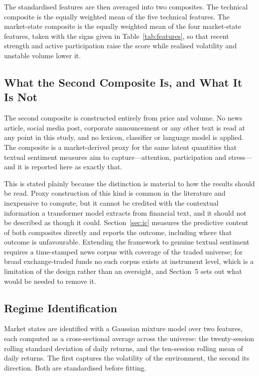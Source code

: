 \documentclass{singlecol-new}
\theoremstyle{TH}{
\newtheorem{lemma}{Lemma}
\newtheorem{theorem}[lemma]{Theorem}
\newtheorem{corrolary}[lemma]{Corrolary}
\newtheorem{conjecture}[lemma]{Conjecture}
\newtheorem{proposition}[lemma]{Proposition}
\newtheorem{claim}[lemma]{Claim}
\newtheorem{stheorem}[lemma]{Wrong Theorem}
\newtheorem{algorithm}{Algorithm}
}
\theoremstyle{THrm}{
\newtheorem{definition}{Definition}[section]
\newtheorem{question}{Question}[section]
\newtheorem{remark}{Remark}
\newtheorem{scheme}{Scheme}
}
\theoremstyle{THhit}{
\newtheorem{case}{Case}[section]
}
\begin{document}
The standardised features are then averaged into two composites. The technical
composite is the equally weighted mean of the five technical features. The market-state
composite is the equally weighted mean of the four market-state features, taken with
the signs given in Table~\ref{tab:features}, so that recent strength and active participation raise the
score while realised volatility and unstable volume lower it.

\subsection{What the Second Composite Is, and What It Is Not}
\label{sec:notsentiment}

The second composite is constructed entirely from price and volume. No news article,
social media post, corporate announcement or any other text is read at any point in
this study, and no lexicon, classifier or language model is applied. The composite is a
market-derived proxy for the same latent quantities that textual sentiment measures aim
to capture---attention, participation and stress---and it is reported here as exactly
that.

This is stated plainly because the distinction is material to how the results should be
read. Proxy construction of this kind is common in the literature and inexpensive to
compute, but it cannot be credited with the contextual information a transformer model
extracts from financial text, and it should not be described as though it could.
Section~\ref{sec:ic} measures the predictive content of both composites directly and
reports the outcome, including where that outcome is unfavourable. Extending the
framework to genuine textual sentiment requires a time-stamped news corpus with
coverage of the traded universe; for broad exchange-traded funds no such corpus exists
at instrument level, which is a limitation of the design rather than an oversight, and
Section~5 sets out what would be needed to remove it.

\subsection{Regime Identification}

Market states are identified with a Gaussian mixture model over two features, each
computed as a cross-sectional average across the universe: the twenty-session rolling
standard deviation of daily returns, and the ten-session rolling mean of daily returns.
The first captures the volatility of the environment, the second its direction. Both
are standardised before fitting.
\end{document}
